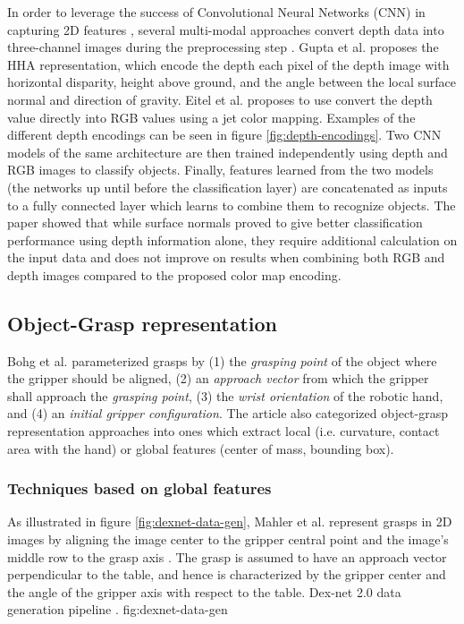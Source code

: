 In order to leverage the success of Convolutional Neural Networks (CNN) in capturing 2D features \cite{Gu2018}, several
multi-modal approaches convert depth data into three-channel images during the preprocessing step
\cite{Eitel2015,Gupta2014RGBDFeatures}. Gupta et al. \cite{Gupta2014RGBDFeatures} proposes the HHA representation, which
encode the depth each pixel of the depth image with horizontal disparity, height above ground, and the angle between the
local surface normal and direction of gravity. Eitel et al. \cite{Eitel2015} proposes to use convert the depth value
directly into RGB values using a jet color mapping. Examples of the different depth encodings can be seen in figure
\ref{fig:depth-encodings}. Two CNN models of the same architecture are then trained independently using depth and RGB
images to classify objects. Finally, features learned from the two models (the networks up until before the
classification layer) are concatenated as inputs to a fully connected layer which learns to combine them to recognize
objects. The paper showed that while surface normals proved to give better classification performance using depth
information alone, they require additional calculation on the input data and does not improve on results when combining
both RGB and depth images compared to the proposed color map encoding.

\subsection{Object-Grasp representation}
Bohg et al. \cite{Bohg2014} parameterized grasps by (1) the \emph{grasping point} of the object where the gripper
should be aligned, (2) an \emph{approach vector} from which the gripper shall approach the \emph{grasping point},
(3) the \emph{wrist orientation} of the robotic hand, and (4) an \emph{initial gripper configuration}.
The article also categorized object-grasp representation approaches into ones which extract local (i.e. curvature,
contact area with the hand) or global features (center of mass, bounding box).

\subsubsection*{Techniques based on global features}
As illustrated in figure \ref{fig:dexnet-data-gen}, Mahler et al. represent grasps in 2D images by aligning the image
center to the gripper central point and the image's middle row to the grasp axis \cite{mahler2017}. The grasp is assumed
to have an approach vector perpendicular to the table, and hence is characterized by the gripper center and the angle of
the gripper axis with respect to the table.
             {Dex-net 2.0 data generation pipeline \cite{mahler2017}.}
             {fig:dexnet-data-gen}{\textwidth}

